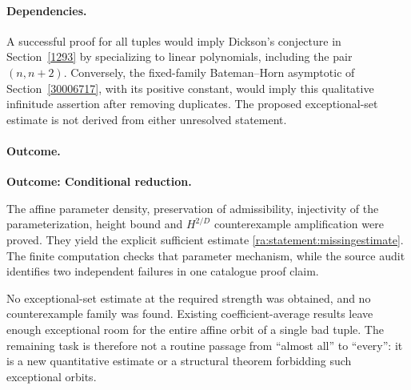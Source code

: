 \documentclass[11pt]{article}
\begin{document}
\paragraph{Dependencies.}
A successful proof for all tuples would imply Dickson's conjecture in
Section~\ref{1293} by specializing to linear polynomials, including the
pair $(n,n+2)$. Conversely, the fixed-family Bateman--Horn asymptotic of
Section~\ref{30006717}, with its positive constant, would imply this qualitative
infinitude assertion after removing duplicates. The proposed
exceptional-set estimate is not derived from either unresolved statement.

\paragraph{Outcome.}
\textbf{Outcome: Conditional reduction.}

The affine parameter density, preservation of admissibility, injectivity
of the parameterization, height bound and $H^{2/D}$ counterexample
amplification were proved. They yield the explicit sufficient estimate
\eqref{ra:statement:missingestimate}. The finite computation checks that
parameter mechanism, while the source audit identifies two independent
failures in one catalogue proof claim.

No exceptional-set estimate at the required strength was obtained, and
no counterexample family was found. Existing coefficient-average results
leave enough exceptional room for the entire affine orbit of a single
bad tuple. The remaining task is therefore not a routine passage from
``almost all'' to ``every'': it is a new quantitative estimate or a
structural theorem forbidding such exceptional orbits.
\end{document}
